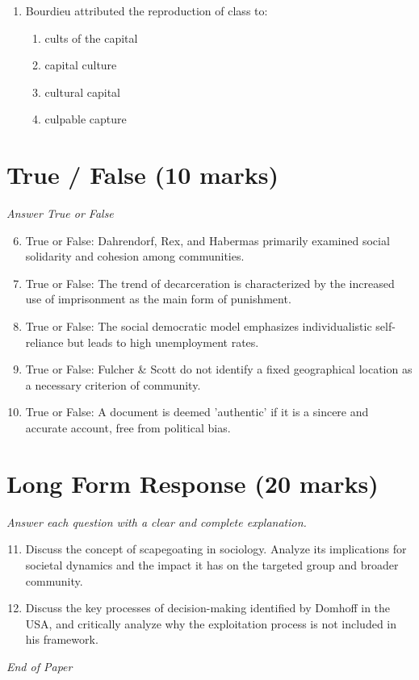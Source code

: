 \documentclass[12pt]{article}
\begin{document}
\begin{enumerate}[label=\arabic*.]
\begin{enumerate}[label=(\alph*)]
    \item ways of acting, thinking, and feeling that are collective and social in origin
    \item the way scientists construct knowledge in a social context
    \item data collected about social phenomena that are proven to be correct
    \item ideas and theories that have no basis in the external, physical world
\end{enumerate}
\item Bourdieu attributed the reproduction of class to:
\begin{enumerate}[label=(\alph*)]
    \item cults of the capital
    \item capital culture
    \item cultural capital
    \item culpable capture
\end{enumerate}
\end{enumerate}

\section*{True / False (10 marks)}
\textit{Answer True or False}
\begin{enumerate}[label=\arabic*.]
\setcounter{enumi}{5}
\item True or False: Dahrendorf, Rex, and Habermas primarily examined social solidarity and cohesion among communities.
\item True or False: The trend of decarceration is characterized by the increased use of imprisonment as the main form of punishment.
\item True or False: The social democratic model emphasizes individualistic self-reliance but leads to high unemployment rates.
\item True or False: Fulcher \& Scott do not identify a fixed geographical location as a necessary criterion of community.
\item True or False: A document is deemed 'authentic' if it is a sincere and accurate account, free from political bias.
\end{enumerate}

\section*{Long Form Response (20 marks)}
\textit{Answer each question with a clear and complete explanation.}
\begin{enumerate}[label=\arabic*.]
\setcounter{enumi}{10}
\item Discuss the concept of scapegoating in sociology. Analyze its implications for societal dynamics and the impact it has on the targeted group and broader community.
\item Discuss the key processes of decision-making identified by Domhoff in the USA, and critically analyze why the exploitation process is not included in his framework.
\end{enumerate}

\vfill
\noindent\textit{End of Paper}
\end{document}
